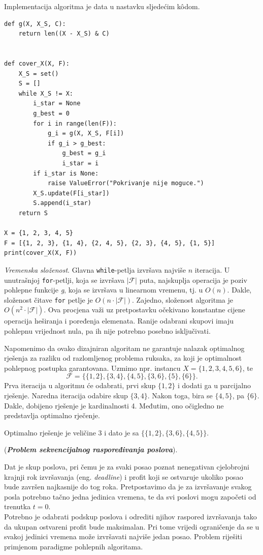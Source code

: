 Implementacija algoritma  je data u nastavku sljedećim k\^odom.

\begin{verbatim}
def g(X, X_S, C):
    return len((X - X_S) & C)


def cover_X(X, F):
    X_S = set()
    S = []
    while X_S != X:
        i_star = None
        g_best = 0
        for i in range(len(F)):
            g_i = g(X, X_S, F[i])
            if g_i > g_best:
                g_best = g_i
                i_star = i
        if i_star is None:
            raise ValueError("Pokrivanje nije moguce.")
        X_S.update(F[i_star])
        S.append(i_star)
    return S

X = {1, 2, 3, 4, 5}
F = [{1, 2, 3}, {1, 4}, {2, 4, 5}, {2, 3}, {4, 5}, {1, 5}]
print(cover_X(X, F))
\end{verbatim}

\textit{Vremenska složenost}. Glavna \texttt{while}-petlja izvršava najviše $n$ iteracija. U unutrašnjoj \texttt{for}-petlji, koja se izvršava  $ |\mathcal{F}|$ puta, najskuplja operacija je poziv pohlepne funkcije \textit{g}, koja se izvršava u linearnom vremenu, tj. u $O(n)$. Dakle, složenost čitave \texttt{for} petlje je $O(n \cdot  |\mathcal{F} |)$. Zajedno, složenost algoritma je $O(n^2 \cdot  |\mathcal{F} |)$. Ova procjena važi uz pretpostavku očekivano konstantne cijene operacija heširanja i poređenja elemenata. Ranije odabrani skupovi imaju pohlepnu vrijednost nula, pa ih nije potrebno posebno isključivati. 

Napomenimo da ovako dizajniran algoritam ne garantuje nalazak opti\-malnog rješenja  za razliku od razlomljenog problema ruksaka, za koji je optimalnost pohlepnog postupka garantovana. Uzmimo npr. instancu $X= \{1, 2, 3, 4, 5, 6\}$, te $$\mathcal{F}= \{\{1,2\}, \{3, 4\}, \{4, 5\}, \{3, 6\}, \{5\}, \{6\} \}.$$   
  Prva iteracija u algoritmu će odabrati, prvi skup $\{1, 2\}$ i dodati ga u parcijalno rješenje. Naredna iteracija odabire skup $\{3, 4\}$. Nakon toga, bira se $\{4, 5\}$, pa $\{6\}$. Dakle, dobijeno rješenje je kardinalnosti 4. Međutim, ono očigledno ne predstavlja optimalno rječenje. 
  
  Optimalno rješenje je veličine 3 i dato je sa $\{ \{1, 2\}, \{3, 6\}, \{4,5\}\}$.  
	 


\begin{example}
	(\textbf{\emph{Problem sekvencijalnog raspoređivanja poslova}}).
	
	Dat je skup poslova, pri čemu je za svaki posao poznat nenegativan cjelobrojni krajnji rok izvršavanja (eng. \emph{deadline}) i profit koji se ostvaruje ukoliko posao bude završen najkasnije do tog roka. Pretpostavimo da je za izvršavanje svakog posla potrebno tačno jedna jedinica vremena, te da svi poslovi mogu započeti od trenutka $t=0$.\\ 

	
	Potrebno je odabrati podskup poslova i odrediti njihov raspored izvršavanja tako da ukupan ostvareni profit bude maksimalan. Pri tome vrijedi ograničenje da se u svakoj jedinici vremena može izvršavati najviše jedan posao.	Problem riješiti primjenom paradigme pohlepnih algoritama.
\end{example}


